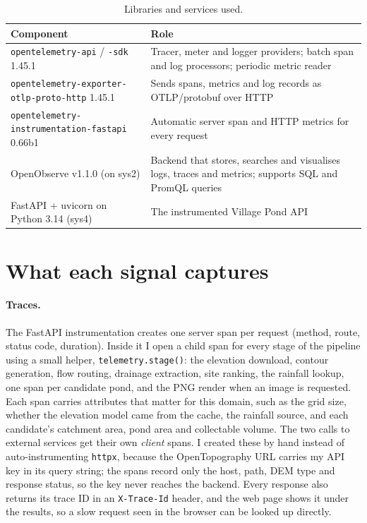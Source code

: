 \documentclass[11pt]{article}
\begin{document}
\begin{table}[htbp]
\centering
\small
\begin{tabularx}{\linewidth}{@{}lX@{}}
\toprule
Component & Role \\
\midrule
\texttt{opentelemetry-api} / \texttt{-sdk} 1.45.1 & Tracer, meter and logger providers; batch span and log processors; periodic metric reader \\
\texttt{opentelemetry-exporter-otlp-proto-http} 1.45.1 & Sends spans, metrics and log records as OTLP/protobuf over HTTP \\
\texttt{opentelemetry-instrumentation-fastapi} 0.66b1 & Automatic server span and HTTP metrics for every request \\
OpenObserve v1.1.0 (on sys2) & Backend that stores, searches and visualises logs, traces and metrics; supports SQL and PromQL queries \\
FastAPI + uvicorn on Python 3.14 (sys4) & The instrumented Village Pond API \\
\bottomrule
\end{tabularx}
\caption{Libraries and services used.}
\end{table}

\section{What each signal captures}

\paragraph{Traces.}
The FastAPI instrumentation creates one server span per request (method, route,
status code, duration). Inside it I open a child span for every stage of the
pipeline using a small helper, \texttt{telemetry.stage()}: the elevation download,
contour generation, flow routing, drainage extraction, site ranking, the rainfall
lookup, one span per candidate pond, and the PNG render when an image is requested.
Each span carries attributes that matter for this domain, such as the grid size,
whether the elevation model came from the cache, the rainfall source, and each
candidate's catchment area, pond area and collectable volume. The two calls to
external services get their own \emph{client} spans. I created these by hand instead
of auto-instrumenting \texttt{httpx}, because the OpenTopography URL carries my API
key in its query string; the spans record only the host, path, DEM type and response
status, so the key never reaches the backend. Every response also returns its trace
ID in an \texttt{X-Trace-Id} header, and the web page shows it under the results, so
a slow request seen in the browser can be looked up directly.
\end{document}
